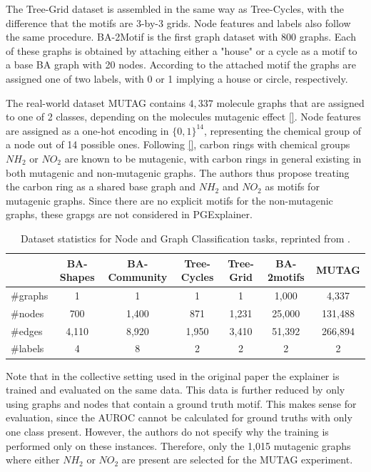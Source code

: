 The Tree-Grid dataset is assembled in the same way as Tree-Cycles, with the difference that the motifs are 3-by-3 grids. Node features and labels also follow the same procedure.
BA-2Motif is the first graph dataset with 800 graphs. Each of these graphs is obtained by attaching either a "house" or a cycle as a motif to a base BA graph with 20 nodes. According to the attached motif the graphs are assigned one of two labels, with 0 or 1 implying a house or circle, respectively.

The real-world dataset MUTAG contains $4,337$ molecule graphs that are assigned to one of 2 classes, depending on the molecules mutagenic effect \ref{}. Node features are assigned as a one-hot encoding in $\{0,1\}^{14}$, representing the chemical group of a node out of 14 possible ones. Following \ref{}, carbon rings with chemical groups $NH_2$ or $NO_2$ are known to be mutagenic, with carbon rings in general existing in both mutagenic and non-mutagenic graphs. The authors thus propose treating the carbon ring as a shared base graph and $NH_2$ and $NO_2$ as motifs for mutagenic graphs. Since there are no explicit motifs for the non-mutagenic graphs, these grapgs are not considered in PGExplainer.

\begin{table}[h]
    \centering
    \scriptsize
    \begin{tabular}{l|cccc|cc}
    \hline
    \textbf{} & \textbf{BA-Shapes} & \textbf{BA-Community} & \textbf{Tree-Cycles} & \textbf{Tree-Grid} & \textbf{BA-2motifs} & \textbf{MUTAG} \\
    \hline
    \#graphs & 1 & 1 & 1 & 1 & 1,000 & 4,337 \\
    \#nodes  & 700 & 1,400 & 871 & 1,231 & 25,000 & 131,488 \\
    \#edges  & 4,110 & 8,920 & 1,950 & 3,410 & 51,392 & 266,894 \\
    \#labels & 4 & 8 & 2 & 2 & 2 & 2 \\
    \hline
    \end{tabular}
    \caption[Statistics of PGExplainer datasets]{Dataset statistics for Node and Graph Classification tasks, reprinted from \cite{luo2020parameterized}.}
    \label{tab:dataset-statistics}
\end{table}

Note that in the collective setting used in the original paper the explainer is trained and evaluated on the same data. This data is further reduced by only using graphs and nodes that contain a ground truth motif. This makes sense for evaluation, since the AUROC cannot be calculated for ground truths with only one class present. However, the authors do not specify why the training is performed only on these instances. Therefore, only the 1,015 mutagenic graphs where either $NH_2$ or $NO_2$ are present are selected for the MUTAG experiment. \bigskip

